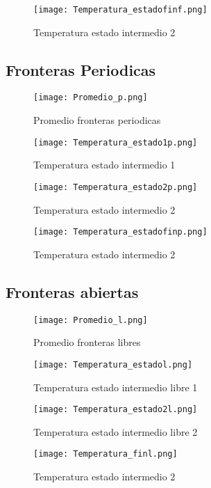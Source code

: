 \documentclass{article}
\begin{document}
\begin{figure}[H] 
\centering
\texttt{[image: Temperatura\_estadofinf.png]}
\caption{\label{fig:data}Temperatura estado intermedio 2 }
\end{figure}


\subsection{Fronteras Periodicas}

\begin{figure}[H] 
\centering
\texttt{[image: Promedio\_p.png]}
\caption{\label{fig:data}Promedio fronteras periodicas}
\end{figure}

\begin{figure}[H] 
\centering
\texttt{[image: Temperatura\_estado1p.png]}
\caption{\label{fig:data}Temperatura estado intermedio 1 }
\end{figure}

\begin{figure}[H] 
\centering
\texttt{[image: Temperatura\_estado2p.png]}
\caption{\label{fig:data}Temperatura estado intermedio 2}
\end{figure}

\begin{figure}[H] 
\centering
\texttt{[image: Temperatura\_estadofinp.png]}
\caption{\label{fig:data}Temperatura estado intermedio 2 }
\end{figure}
\subsection{Fronteras abiertas}

\begin{figure}[H] 
\centering
\texttt{[image: Promedio\_l.png]}
\caption{\label{fig:data}Promedio fronteras libres}
\end{figure}

\begin{figure}[H] 
\centering
\texttt{[image: Temperatura\_estadol.png]}
\caption{\label{fig:data}Temperatura estado intermedio libre 1}
\end{figure}

\begin{figure}[H] 
\centering
\texttt{[image: Temperatura\_estado2l.png]}
\caption{\label{fig:data}Temperatura estado intermedio libre 2}
\end{figure}

\begin{figure}[H] 
\centering
\texttt{[image: Temperatura\_finl.png]}
\caption{\label{fig:data}Temperatura estado intermedio 2 }
\end{figure}
\end{document}
